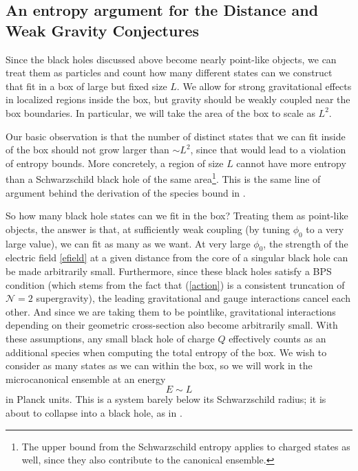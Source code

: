 \documentclass[11pt]{article}
\numberwithin{equation}{section}
\newcommand{\eq}[1]{(\ref{#1})}
\numberwithin{equation}{section}
\theoremstyle{remark}
\begin{document}
 
\subsection{An entropy argument for the Distance and Weak Gravity Conjectures\label{BHargument}}
Since the black holes discussed above become nearly point-like objects, we can treat them as particles and count how many different states can we construct that fit in a box of large but fixed size $L$. We allow for strong gravitational effects in localized regions inside the box, but gravity should be weakly coupled near the box boundaries. In particular, we will take the area of the box to scale as $L^2$.  

Our basic observation is that the number of distinct states that we can fit inside of the box should not grow larger than $\sim L^2$, since that would lead to a violation of entropy bounds. More concretely, a region of size $L$ cannot have more entropy than a Schwarzschild black hole of the same area\footnote{The upper bound from the Schwarzschild entropy applies to charged states as well, since they also contribute to the canonical ensemble.}. This is the same line of argument behind the derivation of the species bound in \cite{Dvali:2007hz,Dvali:2007wp}.

So how many black hole states can we fit in the box? Treating them as point-like objects, the answer is that, at sufficiently weak coupling (by tuning $\phi_0$ to a very large value), we can fit as many as we want. At very large $\phi_0$, the strength of the electric field \eqref{efield} at a given distance from the core of a singular black hole can be made arbitrarily small. Furthermore, since these black holes satisfy a BPS condition (which stems from the fact that \eq{action} is a consistent truncation of $\mathcal{N}=2$ supergravity), the leading gravitational and gauge interactions cancel each other. And since we are taking them to be pointlike, gravitational interactions depending on their geometric cross-section also become arbitrarily small. With these assumptions, any small black hole of charge $Q$ effectively counts as an additional species when computing the total entropy of the box. We wish to consider as many states as we can within the box, so we will work in the microcanonical ensemble at an energy 
\begin{equation} E\sim L\label{e322}\end{equation}
in Planck units. This is a system barely below its Schwarzschild radius; it is about to collapse into a black hole, as in \cite{Dvali:2007hz}. 
\end{document}
